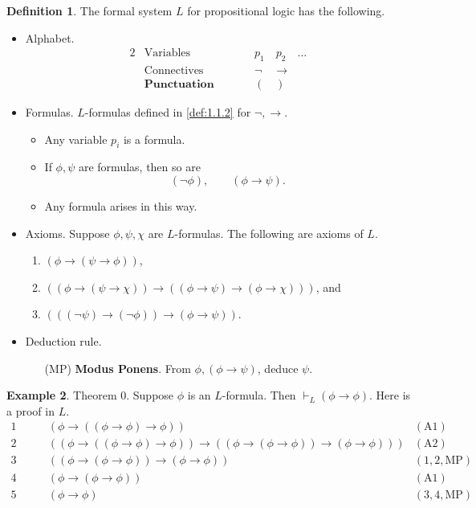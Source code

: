 \documentclass{article}
\newcommand{\rb}[1]{\left( #1 \right)}
\newcommand{\notb}[1]{\rb{\neg #1}}
\newcommand{\impb}[2]{\rb{#1 \rightarrow #2}}
\theoremstyle{definition}\newtheorem{definition}{Definition}[subsection]
\theoremstyle{definition}\newtheorem{remark1}[definition]{Remark}
\theoremstyle{definition}\newtheorem{example1}[definition]{Example}
\theoremstyle{definition}\newtheorem*{remark2}{Remark}
\theoremstyle{definition}\newtheorem*{example2}{Example}
\theoremstyle{definition}\newtheorem*{note}{Note}
\theoremstyle{definition}\newtheorem*{notation}{Notation}
\begin{document}
\begin{definition}
The formal system $ L $ for propositional logic has the following.
\begin{itemize}
\item Alphabet.
\begin{alignat*}{2}
& \text{Variables} & \qquad & p_1 \quad p_2 \quad \dots \\
& \text{Connectives} & \qquad & \neg \quad \rightarrow \\
& \textbf{Punctuation} & \qquad & ( \quad )
\end{alignat*}
\item Formulas. $ L $-formulas defined in \ref{def:1.1.2} for $ \neg, \rightarrow $.
\begin{itemize}
\item Any variable $ p_i $ is a formula.
\item If $ \phi, \psi $ are formulas, then so are
$$ \notb{\phi}, \qquad \impb{\phi}{\psi}. $$
\item Any formula arises in this way.
\end{itemize}
\item Axioms. Suppose $ \phi, \psi, \chi $ are $ L $-formulas. The following are axioms of $ L $.
\begin{enumerate}[label=(A\arabic*)]
\item $ \impb{\phi}{\impb{\psi}{\phi}} $,
\item $ \impb{\impb{\phi}{\impb{\psi}{\chi}}}{\impb{\impb{\phi}{\psi}}{\impb{\phi}{\chi}}} $, and
\item $ \impb{\impb{\notb{\psi}}{\notb{\phi}}}{\impb{\phi}{\psi}} $.
\end{enumerate}
\item Deduction rule.
\begin{itemize}
\item[(MP)] \textbf{Modus Ponens}. From $ \phi, \impb{\phi}{\psi} $, deduce $ \psi $.
\end{itemize}
\end{itemize}
\end{definition}

\begin{example1}
\label{eg:1.2.3}
Theorem $ 0 $. Suppose $ \phi $ is an $ L $-formula. Then $ \vdash_L \impb{\phi}{\phi} $. Here is a proof in $ L $.
\begin{align*}
1 \qquad & \impb{\phi}{\impb{\impb{\phi}{\phi}}{\phi}} & \rb{\text{A1}} \\
2 \qquad & \impb{\impb{\phi}{\impb{\impb{\phi}{\phi}}{\phi}}}{\impb{\impb{\phi}{\impb{\phi}{\phi}}}{\impb{\phi}{\phi}}} & \rb{\text{A2}} \\
3 \qquad & \impb{\impb{\phi}{\impb{\phi}{\phi}}}{\impb{\phi}{\phi}} & \rb{1, 2, \text{MP}} \\
4 \qquad & \impb{\phi}{\impb{\phi}{\phi}} & \rb{\text{A1}} \\
5 \qquad & \impb{\phi}{\phi} & \rb{3, 4, \text{MP}}
\end{align*}
\end{example1}
\end{document}
